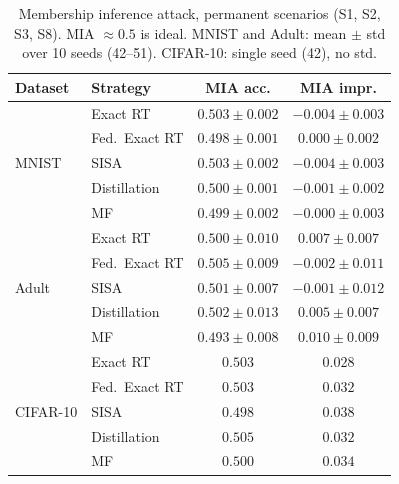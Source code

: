 \begin{table}[H]
\centering
\caption{Membership inference attack, permanent scenarios (S1, S2, S3, S8). MIA $\approx 0.5$ is ideal. MNIST and Adult: mean $\pm$ std over 10 seeds (42--51). CIFAR-10: single seed (42), no std.}
\label{tab:mia}
\small
\renewcommand{\arraystretch}{1.2}
\begin{tabular}{@{} l l c c @{}}
\toprule
\textbf{Dataset} & \textbf{Strategy} & \textbf{MIA acc.} & \textbf{MIA impr.} \\
\midrule
\multirow{5}{*}{MNIST} & Exact RT & $0.503 \pm 0.002$ & $-0.004 \pm 0.003$ \\
 & Fed.\ Exact RT & $0.498 \pm 0.001$ & $0.000 \pm 0.002$ \\
 & SISA & $0.503 \pm 0.002$ & $-0.004 \pm 0.003$ \\
 & Distillation & $0.500 \pm 0.001$ & $-0.001 \pm 0.002$ \\
 & MF & $0.499 \pm 0.002$ & $-0.000 \pm 0.003$ \\
\midrule
\multirow{5}{*}{Adult} & Exact RT & $0.500 \pm 0.010$ & $0.007 \pm 0.007$ \\
 & Fed.\ Exact RT & $0.505 \pm 0.009$ & $-0.002 \pm 0.011$ \\
 & SISA & $0.501 \pm 0.007$ & $-0.001 \pm 0.012$ \\
 & Distillation & $0.502 \pm 0.013$ & $0.005 \pm 0.007$ \\
 & MF & $0.493 \pm 0.008$ & $0.010 \pm 0.009$ \\
\midrule
\multirow{5}{*}{CIFAR-10} & Exact RT & $0.503$ & $0.028$ \\
 & Fed.\ Exact RT & $0.503$ & $0.032$ \\
 & SISA & $0.498$ & $0.038$ \\
 & Distillation & $0.505$ & $0.032$ \\
 & MF & $0.500$ & $0.034$ \\
\bottomrule
\end{tabular}
\end{table}
